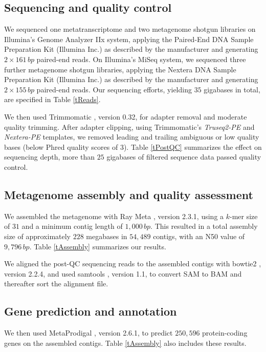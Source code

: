\documentclass{bmcart}
\begin{document}
\subsection*{Sequencing and quality control}
We sequenced one metatranscriptome and two metagenome shotgun libraries on Illumina's Genome Analyzer IIx system, applying the Paired-End DNA Sample Preparation Kit (Illumina Inc.) as described by the manufacturer and generating $2 \times 161\,bp$ paired-end reads.
On Illumina's MiSeq system, we sequenced three further metagenome shotgun libraries, applying the Nextera DNA Sample Preparation Kit (Illumina Inc.) as described by the manufacturer and generating $2 \times 155\,bp$ paired-end reads.
Our sequencing efforts, yielding $35$ gigabases in total, are specified in Table \ref{tReads}.

We then used Trimmomatic \cite{Trimmomatic}, version 0.32, for adapter removal and moderate quality trimming.
After adapter clipping, using Trimmomatic's \emph{Truseq2-PE} and \emph{Nextera-PE} templates, we removed leading and trailing ambiguous or low quality bases (below Phred quality scores of 3).
Table \ref{tPostQC} summarizes the effect on sequencing depth, more than $25$ gigabases of filtered sequence data passed quality control.

\subsection*{Metagenome assembly and quality assessment}
We assembled the metagenome with Ray Meta \cite{RayMeta}, version 2.3.1, using a $k$-mer size of $31$ and a minimum contig length of $1,000\,bp$.
This resulted in a total assembly size of approximately $228$ megabases in $54,489$ contigs, with an N50 value of $9,796\,bp$. %
Table \ref{tAssembly} summarizes our results.

We aligned the post-QC sequencing reads to the assembled contigs with bowtie2 \cite{Bowtie2}, version 2.2.4, and used samtools \cite{Samtools}, version 1.1, to convert SAM to BAM and thereafter sort the alignment file.

\subsection*{Gene prediction and annotation}
We then used MetaProdigal \cite{MetaProdigal}, version 2.6.1, to predict $250,596$ protein-coding genes on the assembled contigs. Table \ref{tAssembly} also includes these results.
\end{document}
